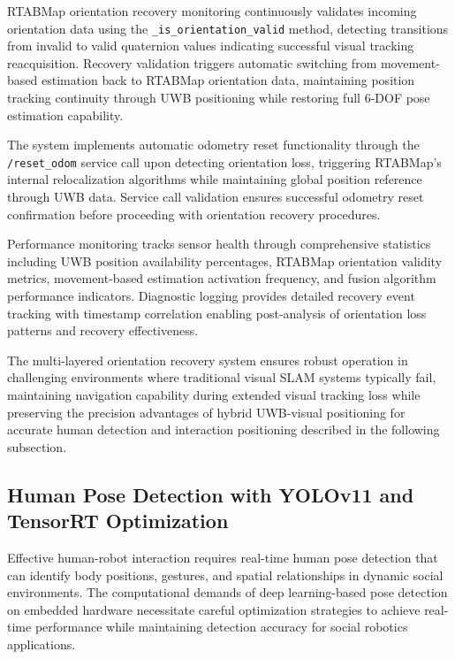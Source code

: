 RTABMap orientation recovery monitoring continuously validates incoming orientation data using the \texttt{\_is\_orientation\_valid} method, detecting transitions from invalid to valid quaternion values indicating successful visual tracking reacquisition. Recovery validation triggers automatic switching from movement-based estimation back to RTABMap orientation data, maintaining position tracking continuity through UWB positioning while restoring full 6-DOF pose estimation capability.

The system implements automatic odometry reset functionality through the \texttt{/reset\_odom} service call upon detecting orientation loss, triggering RTABMap's internal relocalization algorithms while maintaining global position reference through UWB data. Service call validation ensures successful odometry reset confirmation before proceeding with orientation recovery procedures.

Performance monitoring tracks sensor health through comprehensive statistics including UWB position availability percentages, RTABMap orientation validity metrics, movement-based estimation activation frequency, and fusion algorithm performance indicators. Diagnostic logging provides detailed recovery event tracking with timestamp correlation enabling post-analysis of orientation loss patterns and recovery effectiveness.

The multi-layered orientation recovery system ensures robust operation in challenging environments where traditional visual SLAM systems typically fail, maintaining navigation capability during extended visual tracking loss while preserving the precision advantages of hybrid UWB-visual positioning for accurate human detection and interaction positioning described in the following subsection.



\subsection{Human Pose Detection with YOLOv11 and TensorRT Optimization}

Effective human-robot interaction requires real-time human pose detection that can identify body positions, gestures, and spatial relationships in dynamic social environments. The computational demands of deep learning-based pose detection on embedded hardware necessitate careful optimization strategies to achieve real-time performance while maintaining detection accuracy for social robotics applications.

